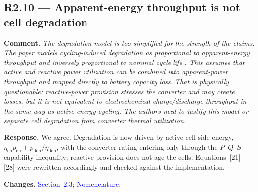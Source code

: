 \documentclass[11pt]{article}
\newcommand{\rcomment}[1]{\par\medskip\noindent\textbf{Comment.} \textit{#1}\par\smallskip}
\newcommand{\rresponse}[1]{\noindent\textbf{Response.} #1\par\smallskip}
\newcommand{\rchanges}[1]{\noindent\textbf{Changes.} \textcolor{blue}{#1}\par\medskip}
\begin{document}
\subsection*{R2.10 --- Apparent-energy throughput is not cell degradation}
\rcomment{
The degradation model is too simplified for the strength of the claims. The paper models cycling-induced degradation as proportional to apparent-energy throughput and inversely proportional to nominal cycle life . This assumes that active and reactive power utilization can be combined into apparent-power throughput and mapped directly to battery capacity loss. That is physically questionable: reactive-power provision stresses the converter and may create losses, but it is not equivalent to electrochemical charge/discharge throughput in the same way as active energy cycling. The authors need to justify this model or separate cell degradation from converter thermal utilization.
}
\rresponse{We agree. Degradation is now driven by active cell-side energy,
$\eta_{\mathrm{ch}} p_{\mathrm{ch}} + p_{\mathrm{dch}}/\eta_{\mathrm{dch}}$, with the converter rating
entering only through the $P$--$Q$--$S$ capability inequality; reactive provision does not age the cells.
Equations~[21]--[28] were rewritten accordingly and checked against the implementation.}
\rchanges{Section~2.3; Nomenclature.}
\end{document}
